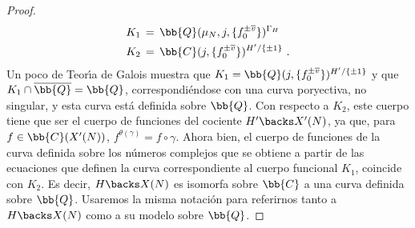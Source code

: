\begin{proof}
\begin{align*}
K_{1} & \,=\,\bb{Q}(\mu_{N},j,\{f_{0}^{\pm\overline{v}}\})^{\Gamma_{H}}\\
K_{2} & \,=\,\bb{C}(j,\{f_{0}^{\pm\overline{v}}\})^{H'/\{\pm 1\}}\text{ .}
\end{align*}
Un poco de Teor\'{\i}a de Galois muestra que
$K_{1}=\bb{Q}(j,\{f_{0}^{\pm\overline{v}}\})^{H'/\{\pm 1\}}$ y que
$K_{1}\cap\overline{\bb{Q}}=\bb{Q}$, correspondi\'{e}ndose con una curva
poryectiva, no singular, y esta curva est\'{a} definida sobre $\bb{Q}$.
Con respecto a $K_{2}$, este cuerpo tiene que ser el cuerpo de funciones del
cociente $H'\backs X'(N)$, ya que, para $f\in\bb{C}(X'(N))$,
$f^{\theta(\gamma)}=f\circ\gamma$. Ahora bien, el cuerpo de funciones de la
curva definida sobre los n\'{u}meros complejos que se obtiene a partir de las
ecuaciones que definen la curva correspondiente al cuerpo funcional $K_{1}$,
coincide con $K_{2}$. Es decir, $H\backs X(N)$ es isomorfa sobre $\bb{C}$ a una
curva definida sobre $\bb{Q}$. Usaremos la misma notaci\'{o}n para referirnos
tanto a $H\backs X(N)$ como a su modelo sobre $\bb{Q}$.

\end{proof}